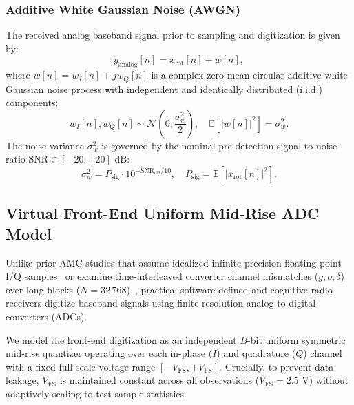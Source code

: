 \subsubsection{Additive White Gaussian Noise (AWGN)}
The received analog baseband signal prior to sampling and digitization is given by:
\begin{equation}
y_{\text{analog}}[n] = x_{\text{rot}}[n] + w[n],
\label{eq:awgn_addition}
\end{equation}
where $w[n] = w_I[n] + j w_Q[n]$ is a complex zero-mean circular additive white Gaussian noise process with independent and identically distributed (i.i.d.) components:
\begin{equation}
w_I[n], w_Q[n] \sim \mathcal{N}\left(0, \frac{\sigma_w^2}{2}\right), \quad \mathbb{E}[|w[n]|^2] = \sigma_w^2.
\end{equation}
The noise variance $\sigma_w^2$ is governed by the nominal pre-detection signal-to-noise ratio $\text{SNR} \in [-20, +20]\text{ dB}$:
\begin{equation}
\sigma_w^2 = P_{\text{sig}} \cdot 10^{-\text{SNR}_{\text{dB}} / 10}, \quad P_{\text{sig}} = \mathbb{E}\left[|x_{\text{rot}}[n]|^2\right].
\end{equation}

\subsection{Virtual Front-End Uniform Mid-Rise ADC Model}
\label{subsec:adc_model}

Unlike prior AMC studies that assume idealized infinite-precision floating-point I/Q samples~\cite{gao2026mlea, quan2026fftformer} or examine time-interleaved converter channel mismatches ($g, o, \delta$) over long blocks ($N=32\,768$)~\cite{gros2025mitigating}, practical software-defined and cognitive radio receivers digitize baseband signals using finite-resolution analog-to-digital converters (ADCs).

We model the front-end digitization as an independent $B$-bit uniform symmetric mid-rise quantizer operating over each in-phase ($I$) and quadrature ($Q$) channel with a fixed full-scale voltage range $[-V_{\text{FS}}, +V_{\text{FS}}]$. Crucially, to prevent data leakage, $V_{\text{FS}}$ is maintained constant across all observations ($V_{\text{FS}} = 2.5\text{ V}$) without adaptively scaling to test sample statistics.

